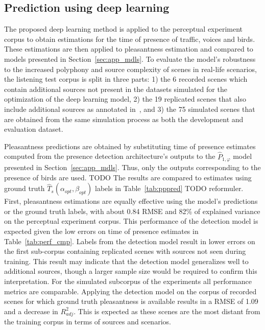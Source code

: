 \documentclass[twocolumn]{article}
\begin{document}
\subsection{Prediction using deep learning}
\label{sec:app_deep}

The proposed deep learning method is applied to the perceptual experiment corpus to obtain estimations for the time of presence of traffic, voices and birds. These estimations are then applied to pleasantness estimation and compared to models presented in Section~\ref{sec:app_mdls}. To evaluate the model's robustness to the increased polyphony and source complexity of scenes in real-life scenarios, the listening test corpus is split in three parts: 1) the 6 recorded scenes which contain additional sources not present in the datasets simulated for the optimization of the deep learning model, 2) the 19 replicated scenes that also include additional sources as annotated in~\cite{gloaguen2017}, and 3) the 75 simulated scenes that are obtained from the same simulation process as both the development and evaluation dataset.

Pleasantness predictions are obtained by substituting time of presence estimates computed from the presence detection architecture's outputs to the $\hat P_{1, \varphi}$ model presented in Section~\ref{sec:app_mdls}. Thus, only the outputs corresponding to the presence of birds are used. TODO The results are compared to estimates using ground truth $\hat T_s(\alpha_{opt}, \beta_{opt})$ labels in Table~\ref{tab:pppred} TODO reformuler. First, pleasantness estimations are equally effective using the model's predictions or the ground truth labels, with about 0.84 RMSE and 82\% of explained variance on the perceptual experiment corpus. This performance of the detection model is expected given the low errors on time of presence estimates in Table~\ref{tab:perf_cmp}. Labels from the detection model result in lower errors on the first sub-corpus containing replicated scenes with sources not seen during training. This result may indicate that the detection model generalizes well to additional sources, though a larger sample size would be required to confirm this interpretation. For the simulated subcorpus of the experiments all performance metrics are comparable. Applying the detection model on the corpus of recorded scenes for which ground truth pleasantness is available results in a RMSE of 1.09 and a decrease in $R^2_{adj}$. This is expected as these scenes are the most distant from the training corpus in terms of sources and scenarios.
\end{document}
